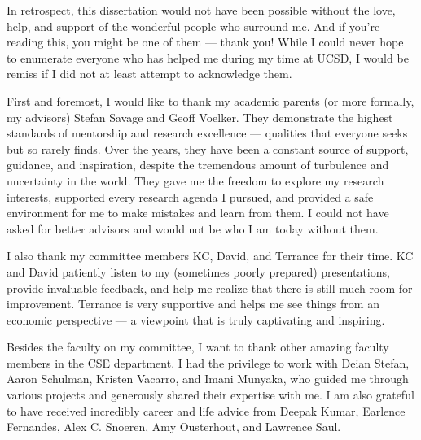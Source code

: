 \documentclass[12pt]{ucsddissertation}
\begin{document}
\begin{acknowledgements}
In retrospect, this dissertation would not have been possible without the love, help,  and support of the wonderful people who surround me. And if you're reading this, you might be one of them --- thank you!
While I could never hope to enumerate everyone who has helped me during my time at UCSD, I would be remiss if I did not at least attempt to acknowledge them. 


First and foremost, I would like to thank my academic parents (or more formally, my advisors) Stefan Savage and Geoff Voelker.
They demonstrate the highest standards of mentorship and research excellence --- qualities that everyone seeks but so rarely finds.
Over the years, they have been a constant source of support, guidance, and inspiration, despite the tremendous amount of turbulence and uncertainty in the world. They gave me the freedom to explore my research interests, supported every research agenda I pursued, and provided a safe environment for me to make mistakes and learn from them. I could not have asked for better advisors and would not be who I am today without them.


I also thank my committee members KC, David, and Terrance for their time. KC and David patiently listen to my (sometimes poorly prepared) presentations, provide invaluable feedback, and help me realize that there is still much room for improvement. Terrance is very supportive and helps me see things from an economic perspective --- a viewpoint that is truly captivating and inspiring.

Besides the faculty on my committee, I want to thank other amazing faculty members in the CSE  department. I had the privilege to work with Deian Stefan, Aaron Schulman, Kristen Vacarro, and Imani Munyaka, who 
guided me through various projects and generously shared their expertise with me. I am also grateful to have received incredibly career and life advice from Deepak Kumar, Earlence Fernandes, Alex C. Snoeren, Amy Ousterhout, and Lawrence Saul.


\end{acknowledgements}
\end{document}
